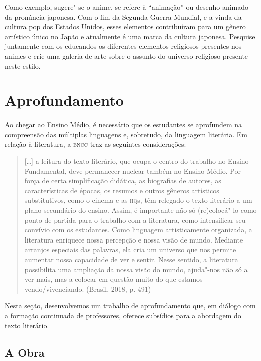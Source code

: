 \documentclass[12pt]{extarticle}
\begin{document}
Como exemplo, sugere"-se o anime, se refere à ``animação'' ou desenho
animado da pronúncia japonesa. Com o fim da Segunda Guerra Mundial, e a
vinda da cultura pop dos Estados Unidos, esses elementos contribuíram
para um gênero artístico único no Japão e atualmente é uma marca da
cultura japonesa. Pesquise juntamente com os educandos os diferentes
elementos religiosos presentes nos animes e crie uma galeria de arte
sobre o assunto do universo religioso presente neste estilo.


\section{Aprofundamento}

Ao chegar ao Ensino Médio, é necessário que os estudantes se aprofundem
na compreensão das múltiplas linguagens e, sobretudo, da linguagem
literária. Em relação à literatura, a \textsc{bncc} traz as seguintes
considerações:

\begin{quote}
{[}\ldots{}{]} a leitura do texto literário, que ocupa o centro do trabalho
no Ensino Fundamental, deve permanecer nuclear também no Ensino Médio.
Por força de certa simplificação didática, as biografias de autores, as
características de épocas, os resumos e outros gêneros artísticos
substitutivos, como o cinema e as \textsc{hq}s, têm relegado o texto literário a
um plano secundário do ensino. Assim, é importante não só (re)colocá"-lo
como ponto de partida para o trabalho com a literatura, como
intensificar seu convívio com os estudantes. Como linguagem
artisticamente organizada, a literatura enriquece nossa percepção e
nossa visão de mundo. Mediante arranjos especiais das palavras, ela cria
um universo que nos permite aumentar nossa capacidade de ver e sentir.
Nesse sentido, a literatura possibilita uma ampliação da nossa visão do
mundo, ajuda"-nos não só a ver mais, mas a colocar em questão muito do
que estamos vendo/vivenciando. (Brasil, 2018, p. 491)
\end{quote}

Nesta seção, desenvolvemos um trabalho de aprofundamento que, em diálogo
com a formação continuada de professores, oferece subsídios para a
abordagem do texto literário.

\subsection{A Obra}
\end{document}
